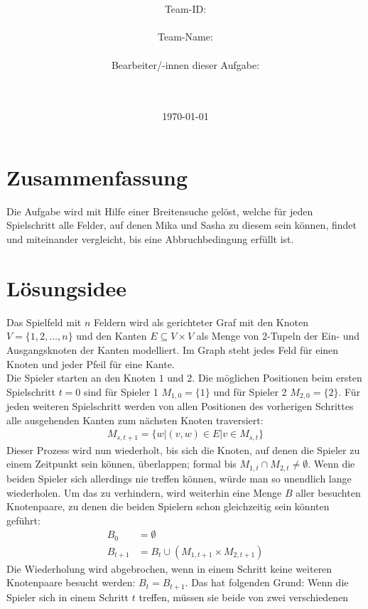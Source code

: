 \documentclass[a4paper,10pt,ngerman]{scrartcl}
\title{\textbf{\Huge\Aufgabe}}
\author{\LARGE Team-ID: \LARGE \TeamId \\\\
  \LARGE Team-Name: \LARGE \TeamName \\\\
  \LARGE Bearbeiter/-innen dieser Aufgabe: \\
  \LARGE \Namen\\\\}
\date{\LARGE\today}
\begin{document}
\maketitle
\tableofcontents

\vspace{0.5cm}

\section{Zusammenfassung}
Die Aufgabe wird mit Hilfe einer Breitensuche gelöst, welche für jeden
Spielschritt alle Felder, auf denen Mika und Sasha zu diesem sein können,
findet und miteinander vergleicht, bis eine Abbruchbedingung erfüllt ist.
\section{Lösungsidee}
Das Spielfeld mit $n$ Feldern wird als gerichteter Graf mit den Knoten
$V=\{1,2,\ldots,n\}$ und den Kanten $E \subseteq V \times V$ als Menge von
2-Tupeln der Ein- und Ausgangsknoten der Kanten modelliert. Im Graph steht jedes Feld
für einen Knoten und jeder Pfeil für eine Kante. \\ 
Die Spieler starten an den Knoten $1$ und $2$. Die möglichen Positionen beim ersten
Spielschritt $t=0$ sind für Spieler 1 $M_{1,0}=\{1\}$ und für Spieler 2
$M_{2,0}=\{2\}$. Für jeden weiteren Spielschritt werden von allen Positionen
des vorherigen Schrittes alle ausgehenden Kanten zum nächsten Knoten
traversiert:
\begin{align*}
  M_{s,t+1} = \{w | (v, w) \in E | v \in M_{s, t}\}
\end{align*}
Dieser Prozess wird nun wiederholt, bis sich die Knoten, auf denen die Spieler zu einem Zeitpunkt sein können, überlappen;
formal bis $M_{1, t} \cap M_{2, t} \neq \emptyset$. Wenn die beiden Spieler sich allerdings nie treffen können, würde man so
unendlich lange wiederholen. Um das zu verhindern, wird weiterhin eine Menge $B$ aller besuchten Knotenpaare, zu denen die
beiden Spielern schon gleichzeitig sein könnten geführt:
\begin{align*}
  B_0     & = \emptyset                                \\
  B_{t+1} & = B_{t} \cup (M_{1,t+1} \times M_{2, t+1})
\end{align*}
Die Wiederholung wird abgebrochen, wenn in einem Schritt keine weiteren Knotenpaare besucht werden: $B_t = B_{t+1}$.
Das hat folgenden Grund: Wenn die Spieler sich in einem Schritt $t$ treffen, müssen sie beide von zwei verschiedenen
\end{document}
